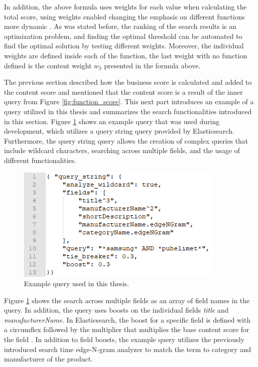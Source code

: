 In addition, the above formula uses weights for each value when calculating the total score,
using weights enabled changing the emphasis on different functions more dynamic \cite{relevantSearch}.
As was stated before, the ranking of the search results is an optimization problem, and finding
the optimal threshold can be automated to find the optimal solution by testing different weights.
Moreover, the individual weights are defined inside each of the function, the last weight
with no function defined is the content weight $w_3$ presented in the formula above.


The previous section described how the business score is calculated and added to the content score
and mentioned that the content score is a result of the inner query from Figure \ref{fig:function_score}.
This next part introduces an example of a query utilized in this thesis and summarizes the search
functionalities introduced in this section.
Figure \ref{fig:query_string} shows an example query that was used during development, which
utilizes a query string query provided by Elasticsearch.
Furthermore, the query string query allows the creation of complex queries that include wildcard characters,
searching across multiple fields, and the usage of different functionalities.


\begin{figure}
    \centering
    \includegraphics[]{img/query_string.png}
    \caption{Example query used in this thesis.}
    \label{fig:query_string}
\end{figure}


Figure \ref{fig:query_string} shows the search across multiple fields as an array of field names 
in the query.
In addition, the query uses boosts on the individual fields \emph{title} and \emph{manufacturerName}.
In Elasticsearch, the boost for a specific field is defined with a circumflex followed by the multiplier
that multiplies the base content score for the field \cite{relevantSearch}.
In addition to field boosts, the example query utilizes the previously introduced search time 
edge-N-gram analyzer to match the term to category and manufacturer of the product.

